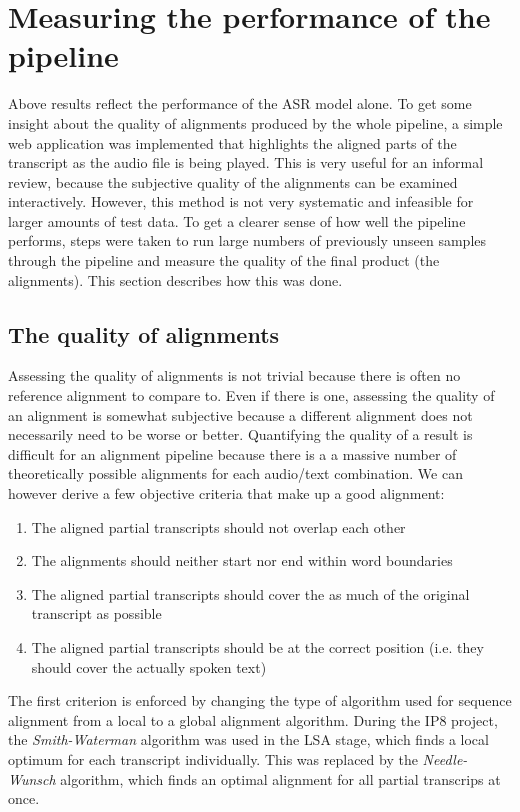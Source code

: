 \section{Measuring the performance of the pipeline}\label{e2e}

Above results reflect the performance of the \ac{ASR} model alone. To get some insight about the quality of alignments produced by the whole pipeline, a simple web application was implemented that highlights the aligned parts of the transcript as the audio file is being played. This is very useful for an informal review, because the subjective quality of the alignments can be examined interactively. However, this method is not very systematic and infeasible for larger amounts of test data. To get a clearer sense of how well the pipeline performs, steps were taken to run large numbers of previously unseen samples through the pipeline and measure the quality of the final product (the alignments). This section describes how this was done.

\subsection{The quality of alignments}

Assessing the quality of alignments is not trivial because there is often no reference alignment to compare to. Even if there is one, assessing the quality of an alignment is somewhat subjective because a different alignment does not necessarily need to be worse or better. Quantifying the quality of a result is difficult for an alignment pipeline because there is a a massive number of theoretically possible alignments for each audio/text combination. We can however derive a few objective criteria that make up a good alignment:

\begin{enumerate}
	\item The aligned partial transcripts should not overlap each other
	\item The alignments should neither start nor end within word boundaries
	\item The aligned partial transcripts should cover the as much of the original transcript as possible	
	\item The aligned partial transcripts should be at the correct position (i.e. they should cover the actually spoken text)
\end{enumerate}

The first criterion is enforced by changing the type of algorithm used for sequence alignment from a local to a global alignment algorithm. During the IP8 project, the \textit{Smith-Waterman} algorithm was used in the \ac{LSA} stage, which finds a local optimum for each transcript individually. This was replaced by the \textit{Needle-Wunsch} algorithm, which finds an optimal alignment for all partial transcrips at once. 

